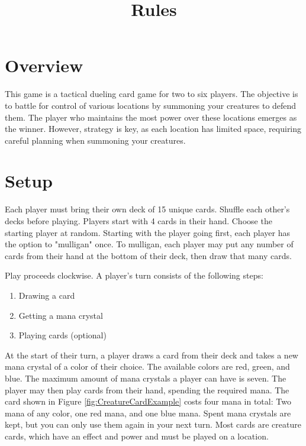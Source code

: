 \documentclass[conference]{IEEEtran}
\begin{document}
\title{Rules}

\author{  
  \IEEEauthorblockN{
  }
}  

\maketitle

\section{Overview}
\label{sec:overview}
This game is a tactical dueling card game for two to six players.
The objective is to battle for control of various locations by summoning your creatures to defend them.
The player who maintains the most power over these locations emerges as the winner. 
However, strategy is key, as each location has limited space, requiring careful planning when summoning your creatures.

\section{Setup}
\label{sec:setup}
Each player must bring their own deck of 15 unique cards.
Shuffle each other's decks before playing.
Players start with 4 cards in their hand.
Choose the starting player at random.
Starting with the player going first, each player has the option to "mulligan" once.
To mulligan, each player may put any number of cards from their hand at the bottom of their deck, then draw that many cards.

Play proceeds clockwise.
A player's turn consists of the following steps:
\begin{enumerate}
    \item Drawing a card
    \item Getting a mana crystal
    \item Playing cards (optional)
  \end{enumerate}
At the start of their turn, a player draws a card from their deck and takes a new mana crystal of a color of their choice. 
The available colors are red, green, and blue.
The maximum amount of mana crystals a player can have is seven.
The player may then play cards from their hand, spending the required mana.
The card shown in Figure \ref{fig:CreatureCardExample} costs four mana in total: Two mana of any color, one red mana, and one blue mana.
Spent mana crystals are kept, but you can only use them again in your next turn.
Most cards are creature cards, which have an effect and power and must be played on a location.
\end{document}
